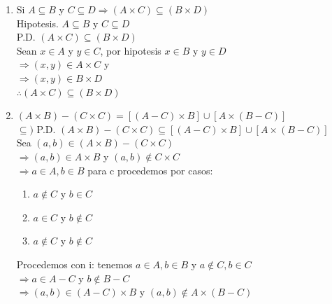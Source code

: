 \documentclass[12pt]{article}
\begin{document}
\begin{enumerate}[label=\alph*)]
    \item Si $A \subseteq B$ y $C \subseteq D \Longrightarrow (A \times C) \subseteq (B \times D)$\\

    Hipotesis. $A \subseteq B$ y $C \subseteq D$\\

    P.D. $(A \times C) \subseteq (B \times D)$\\

    Sean $x \in A$ y $y \in C$, por hipotesis $x \in B$ y $y \in D$\\

    $\Longrightarrow (x, y) \in A \times C$ y\\

    $\Longrightarrow (x, y) \in B \times D$\\

    $\therefore (A \times C) \subseteq (B \times D)$

    \item $(A \times B) - (C \times C) = [(A - C) \times B] \cup [A \times (B - C)]$\\

    $\subseteq)$ P.D. $(A \times B) - (C \times C) \subseteq [(A - C) \times B] \cup [A \times (B - C)]$\\

    Sea $(a, b) \in (A \times B) - (C \times C)$\\

    $\Longrightarrow (a, b) \in A \times B$ y $(a, b) \notin C \times C$\\

    $\Longrightarrow a \in A, b \in B$ para c procedemos por casos:
    \begin{enumerate}[label=\roman*)]
        \item $a \notin C$ y $b \in C$\\
        \item $a \in C$ y $b \notin C$\\
        \item $a \notin C$ y $b \notin C$
    \end{enumerate}
    Procedemos con i: tenemos $a \in A, b \in B$ y $a \notin C, b \in C$\\

    $\Longrightarrow a \in A - C$ y $b \notin B - C$\\

    $\Longrightarrow (a, b) \in (A - C) \times B$ y $(a, b) \notin A \times (B - C)$\\


\end{enumerate}
\end{document}
